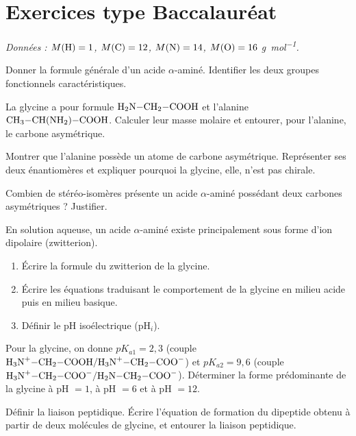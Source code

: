 \section{Exercices type Baccalauréat}
\textit{Données : $M(\ce{H})=1$, $M(\ce{C})=12$, $M(\ce{N})=14$, $M(\ce{O})=16$
\si{\gram\per\mol}.}


\exo{} Donner la formule générale d'un acide $\alpha$-aminé. Identifier les
deux groupes fonctionnels caractéristiques.

\exo{} La glycine a pour formule $\ce{H2N-CH2-COOH}$ et l'alanine
$\ce{CH3-CH(NH2)-COOH}$. Calculer leur masse molaire et entourer, pour l'alanine, le
carbone asymétrique.


\exo{} Montrer que l'alanine possède un atome de carbone asymétrique.
Représenter ses deux énantiomères et expliquer pourquoi la glycine, elle, n'est pas chirale.

\exo{} Combien de stéréo-isomères présente un acide $\alpha$-aminé possédant
deux carbones asymétriques ? Justifier.


\exo{} En solution aqueuse, un acide $\alpha$-aminé existe principalement sous
forme d'ion dipolaire (zwitterion).
\begin{enumerate}[label=\arabic*)]
\item Écrire la formule du zwitterion de la glycine.
\item Écrire les équations traduisant le comportement de la glycine en milieu acide
puis en milieu basique.
\item Définir le pH isoélectrique (pH$_i$).
\end{enumerate}

\exo{} Pour la glycine, on donne $pK_{a1} = 2{,}3$ (couple
$\ce{H3N+-CH2-COOH}/\ce{H3N+-CH2-COO-}$) et $pK_{a2} = 9{,}6$ (couple
$\ce{H3N+-CH2-COO-}/\ce{H2N-CH2-COO-}$). Déterminer la forme prédominante de la
glycine à pH $= 1$, à pH $= 6$ et à pH $= 12$.


\exo{} Définir la liaison peptidique. Écrire l'équation de formation du
dipeptide obtenu à partir de deux molécules de glycine, et entourer la liaison peptidique.

